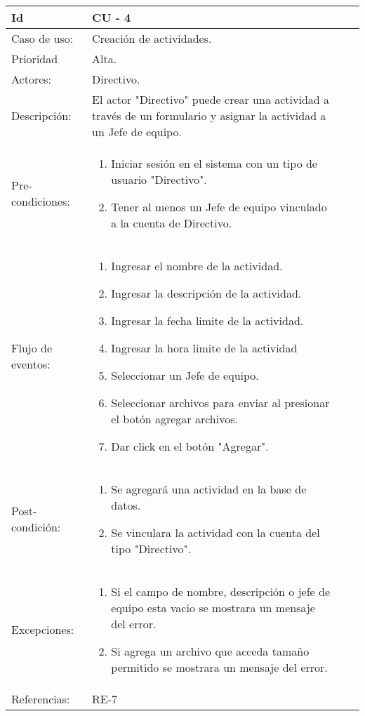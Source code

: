 \documentclass[11pt,a4paper]{article}
\begin{document}
\begin{tabular}[c]{|p{3cm}|p{13cm}|p{2.5cm}|p{3cm}|}
\hline 
\rule[-1ex]{0pt}{2.5ex} Id & CU - 4\\ 
\hline 
\rule[-1ex]{0pt}{2.5ex} Caso de uso: &  Creación de actividades.\\ 
\hline 
\rule[-1ex]{0pt}{2.5ex} Prioridad & Alta. \\ 
\hline 
\rule[-1ex]{0pt}{2.5ex} Actores: & Directivo.\\ 
\hline 
\rule[-1ex]{0pt}{2.5ex} Descripción: & El actor "Directivo" puede crear una actividad a través de un formulario y asignar la actividad a un Jefe de equipo. \\ 
\hline 
\rule[-1ex]{0pt}{2.5ex} Pre-condiciones: & \begin{enumerate}
\item Iniciar sesión en el sistema con un tipo de usuario "Directivo".
\item Tener al menos un Jefe de equipo vinculado a la cuenta de Directivo.
\end{enumerate}  \\ 
\hline 
\rule[-1ex]{0pt}{2.5ex} Flujo de eventos: & \begin{enumerate}
\item Ingresar el nombre de la actividad.
\item Ingresar la descripción de la actividad.
\item Ingresar la fecha limite de la actividad.
\item Ingresar la hora limite de la actividad
\item Seleccionar un Jefe de equipo.
\item Seleccionar archivos para enviar al presionar el botón agregar archivos.
\item Dar click en el botón "Agregar".
\end{enumerate} \\ 
\hline 
\rule[-1ex]{0pt}{2.5ex} Post-condición: & \begin{enumerate}
\item Se agregará una actividad en la base de datos.
\item Se vinculara la actividad con la cuenta del tipo "Directivo".
\end{enumerate} \\ 
\hline 
\rule[-1ex]{0pt}{2.5ex} Excepciones: & \begin{enumerate}
\item Si el campo de nombre, descripción o jefe de equipo esta vacio se mostrara un mensaje del error.
\item Si agrega un archivo que acceda tamaño permitido se mostrara un mensaje del error.
\end{enumerate} \\
\hline 
\rule[-1ex]{0pt}{2.5ex} Referencias: & RE-7\\ 
\hline 
\end{tabular} 
\\
\end{document}
